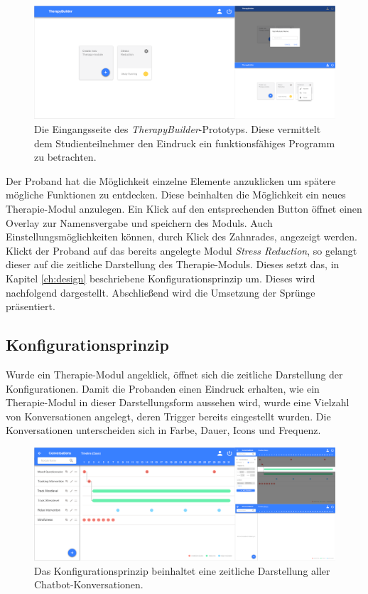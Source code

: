 \begin{figure}[h]
\centering
\includegraphics[width=1\textwidth]{pictures/start}
\caption{Die Eingangsseite des \emph{TherapyBuilder}-Prototyps. Diese vermittelt dem Studienteilnehmer den Eindruck ein funktionsfähiges Programm zu betrachten.}
\label{start}
\end{figure}

Der Proband hat die Möglichkeit einzelne Elemente anzuklicken um spätere mögliche Funktionen zu entdecken. Diese beinhalten die Möglichkeit ein neues Therapie-Modul anzulegen. Ein Klick auf den entsprechenden Button öffnet einen Overlay zur Namensvergabe und speichern des Moduls. Auch Einstellungsmöglichkeiten können, durch Klick des Zahnrades, angezeigt werden. Klickt der Proband auf das bereits angelegte Modul \emph{Stress Reduction}, so gelangt dieser auf die zeitliche Darstellung des Therapie-Moduls. Dieses setzt das, in Kapitel \ref{ch:design} beschriebene Konfigurationsprinzip um. Dieses wird nachfolgend dargestellt. Abschließend wird die Umsetzung der Sprünge präsentiert.

\subsection{Konfigurationsprinzip}
Wurde ein Therapie-Modul angeklick, öffnet sich die zeitliche Darstellung der Konfigurationen. Damit die Probanden einen Eindruck erhalten, wie ein Therapie-Modul in dieser Darstellungsform aussehen wird, wurde eine Vielzahl von Konversationen angelegt, deren Trigger bereits eingestellt wurden. Die Konversationen unterscheiden sich in Farbe, Dauer, Icons und Frequenz. 
 
\begin{figure}[h]
\centering
\includegraphics[width=1\textwidth]{pictures/zeitstrahl}
\caption{Das Konfigurationsprinzip beinhaltet eine zeitliche Darstellung aller Chatbot-Konversationen.}
\label{zeitstrahl}
\end{figure}


